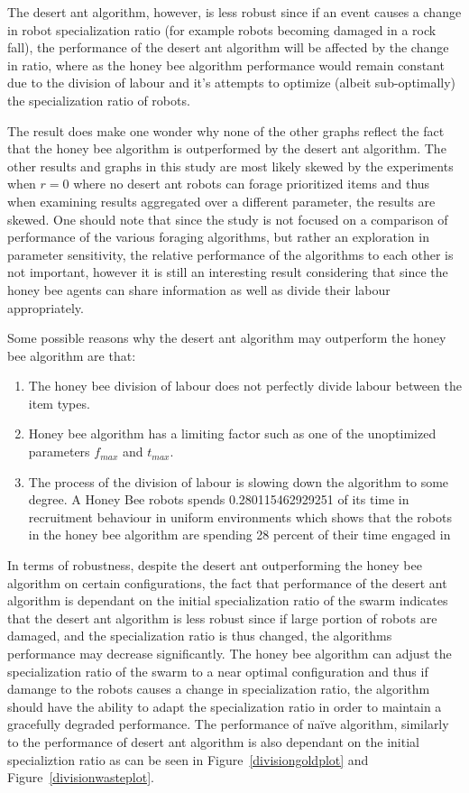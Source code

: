 The desert ant algorithm, however, is less robust since if an event causes a change in robot specialization ratio (for example robots becoming damaged in a rock fall), the performance of the desert ant algorithm will be affected by the change in ratio, where as the honey bee algorithm performance would remain constant due to the division of labour and it's attempts to optimize (albeit sub-optimally) the specialization ratio of robots. 

The result does make one wonder why none of the other graphs reflect the fact that the honey bee algorithm is outperformed by the desert ant algorithm. The other results and graphs in this study are most likely skewed by the experiments when $r=0$ where no desert ant robots can forage prioritized items and thus when examining results aggregated over a different parameter, the results are skewed. One should note that since the study is not focused on a comparison of performance of the various foraging algorithms, but rather an exploration in parameter sensitivity, the relative performance of the algorithms to each other is not important, however it is still an interesting result considering that since the honey bee agents can share information as well as divide their labour appropriately. 
 
Some possible reasons why the desert ant algorithm may outperform the honey bee algorithm are that:
\begin{enumerate}
	\item The honey bee division of labour does not perfectly divide labour between the item types.
	\item Honey bee algorithm has a limiting factor such as one of the unoptimized parameters $f_{max}$ and $t_{max}$. 
	\item The process of the division of labour is slowing down the algorithm to some degree. A Honey Bee robots spends 0.280115462929251 of its time in recruitment behaviour in uniform environments which shows that the robots in the honey bee algorithm are spending 28 percent of their time engaged in 
\end{enumerate}

In terms of robustness, despite the desert ant outperforming the honey bee algorithm on certain configurations, the fact that performance of the desert ant algorithm is dependant on the initial specialization ratio of the swarm indicates that the desert ant algorithm is less robust since if large portion of robots are damaged, and the specialization ratio is thus changed, the algorithms performance may decrease significantly. The honey bee algorithm can adjust the specialization ratio of the swarm to a near optimal configuration and thus if damange to the robots causes a change in specialization ratio, the algorithm should have the ability to adapt the specialization ratio in order to maintain a gracefully degraded performance. The performance of na\"ive algorithm, similarly to the performance of desert ant algorithm is also dependant on the initial specializtion ratio as can be seen in Figure~\ref{divisiongoldplot} and Figure~\ref{divisionwasteplot}. 

